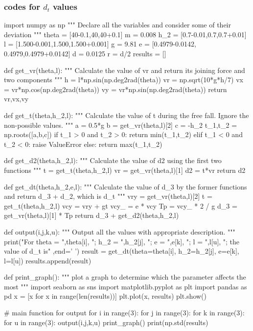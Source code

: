 \documentclass{article}
\begin{document}
    \subsubsection{codes for $d_t$ values}
    \begin{python}
import numpy as np
"""
Declare all the variables
and consider some of their
deviation
"""
theta = [40-0.1,40,40+0.1] 
m = 0.008
h_2 = [0.7-0.01,0.7,0.7+0.01]
l = [1.500-0.001,1.500,1.500+0.001] 
g = 9.81
e = [0.4979-0.0142,
    0.4979,0.4979+0.0142] 
d = 0.0125
r = d/2
results = []

def get_vr(theta,l):
    """
    Calculate the value of vr and return
    its joining force and two components
    """
    h = l*np.sin(np.deg2rad(theta))
    vr = np.sqrt(10*g*h/7)
    vx = vr*np.cos(np.deg2rad(theta))
    vy = vr*np.sin(np.deg2rad(theta))
    return vr,vx,vy
    
def get_t(theta,h_2,l):
    """
    Calculate the value of t
    during the free fall.
    Ignore the non-possible values.
    """
    a = 0.5*g
    b = get_vr(theta,l)[2]
    c = -h_2
    t_1,t_2 = np.roots([a,b,c])
    if t_1 > 0 and t_2 > 0:
        return min(t_1,t_2)
    elif t_1 < 0 and t_2 < 0:
        raise ValueError
    else:
        return max(t_1,t_2)
        
def get_d2(theta,h_2,l):
    """
    Calculate the value of d2
    using the first two functions
    """
    t = get_t(theta,h_2,l)
    vr = get_vr(theta,l)[1]
    d2 = t*vr
    return d2
    
def get_dt(theta,h_2,e,l):
    """
    Calculate the value of d_3
    by the former functions and 
    return d_3 + d_2, which is 
    d_t
    """
    vry = get_vr(theta,l)[2]
    t = get_t(theta,h_2,l)
    vcy = vry + gt
    vcy_ = e * vcy
    Tp = vcy_ * 2 / g
    d_3 = get_vr(theta,l)[1] * Tp
    return d_3 + get_d2(theta,h_2,l)
    
def output(i,j,k,u):
    """
    Output all the values with
    appropriate description.
    """
    print("For theta = ",theta[i],
          "; h_2 = ",h_2[j],
          "; e = ",e[k],
          "; l = ",l[u],
          "; the value of d_t is"
          ,end=' ')
    result = get_dt(theta=theta[i],
                    h_2=h_2[j],
                    e=e[k],
                    l=l[u])
    results.append(result)

def print_graph():
    """
    plot a graph to determine which
    the parameter affects the most
    """
    import seaborn as sns
    import matplotlib.pyplot as plt
    import pandas as pd
    x = [x for x in range(len(results))]
    plt.plot(x, results)
    plt.show()

# main function for output     
for i in range(3):
    for j in range(3):
        for k in range(3):
            for u in range(3):
                output(i,j,k,u)
print_graph()
print(np.std(results)

    \end{python}
\end{document}
